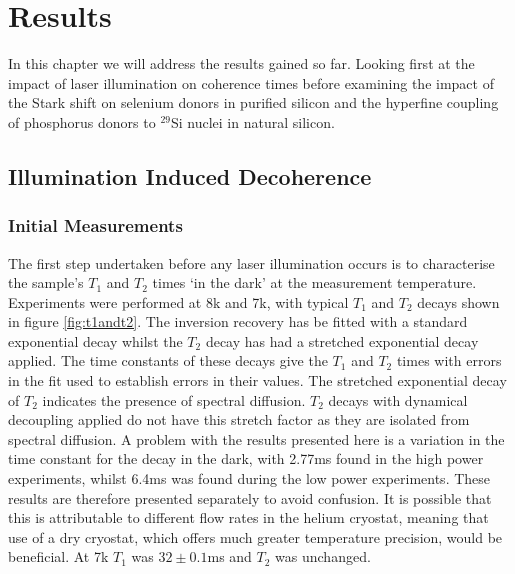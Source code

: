 \chapter{Results}

In this chapter we will address the results gained so far. Looking first at the impact of laser illumination on coherence times before examining the impact of the Stark shift on selenium donors in purified silicon and the hyperfine coupling of phosphorus donors to $^{29}$Si nuclei in natural silicon.

\section{Illumination Induced Decoherence}

\subsection{Initial Measurements}

The first step undertaken before any laser illumination occurs is to characterise the sample's $T_1$ and $T_2$ times `in the dark' at the measurement temperature. 
Experiments were performed at 8k and 7k, with typical $T_1$ and $T_2$ decays shown in figure \ref{fig:t1andt2}.
The inversion recovery has be fitted with a standard exponential decay whilst the $T_2$ decay has had a stretched exponential decay applied.
The time constants of these decays give the $T_1$ and $T_2$ times with errors in the fit used to establish errors in their values.
The stretched exponential decay of $T_2$ indicates the presence of spectral diffusion.
$T_2$ decays with dynamical decoupling applied do not have this stretch factor as they are isolated from spectral diffusion.
A problem with the results presented here is a variation in the time constant for the decay in the dark, with 2.77ms found in the high power experiments, whilst 6.4ms was found during the low power experiments. 
These results are therefore presented separately to avoid confusion.
It is possible that this is attributable to different flow rates in the helium cryostat, meaning that use of a dry cryostat, which offers much greater temperature precision, would be beneficial. 
At 7k $T_1$ was $32\pm0.1$ms and $T_2$ was unchanged.


